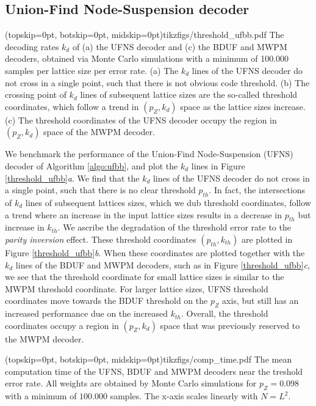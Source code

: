 \subsection{Union-Find Node-Suspension decoder}

\Figure[htb](topskip=0pt, botskip=0pt, midskip=0pt){tikzfigs/threshold_ufbb.pdf}{
  The decoding rates $k_d$ of (a) the UFNS decoder and (c) the BDUF and MWPM decoders, obtained via Monte Carlo simulations with a minimum of 100.000 samples per lattice size per error rate. (a) The $k_d$ lines of the UFNS decoder do not cross in a single point, such that there is not obvious code threshold. (b) The crossing point of $k_d$ lines of subsequent lattice sizes are the so-called threshold coordinates, which follow a trend in $(p_Z, k_d)$ space as the lattice sizes increase. (c) The threshold coordinates of the UFNS decoder occupy the region in $(p_Z, k_d)$ space of the MWPM decoder. \label{threshold_ufbb}}

We benchmark the performance of the Union-Find Node-Suspension (UFNS) decoder of Algorithm \ref{algo:ufbb}, and plot the $k_d$ lines in Figure \ref{threshold_ufbb}\emph{a}. We find that the $k_d$ lines of the UFNS decoder do not cross in a single point, such that there is no clear threshold $p_{th}$. In fact, the intersections of $k_d$ lines of subsequent lattices sizes, which we dub threshold coordinates, follow a trend where an increase in the input lattice sizes results in a decrease in $p_{th}$ but increase in $k_{th}$. We ascribe the degradation of the threshold error rate to the \emph{parity inversion} effect. These threshold coordinates $(p_{th}, k_{th})$ are plotted in Figure \ref{threshold_ufbb}\emph{b}. When these coordinates are plotted together with the $k_d$ lines of the BDUF and MWPM decoders, such as in Figure \ref{threshold_ufbb}\emph{c}, we see that the threshold coordinate for small lattice sizes is similar to the MWPM threshold coordinate. For larger lattice sizes, UFNS threshold coordinates move towards the BDUF threshold on the $p_Z$ axis, but still has an increased performance due on the increased $k_{th}$. Overall, the threshold coordinates occupy a region in $(p_Z, k_d)$ space that was previously reserved to the MWPM decoder. 

\Figure[htb](topskip=0pt, botskip=0pt, midskip=0pt){tikzfigs/comp_time.pdf}{
  The mean computation time of the UFNS, BDUF and MWPM decoders near the treshold error rate. All weights are obtained by Monte Carlo simulations for $p_Z=0.098$ with a minimum of $100.000$ samples. The x-axis scales linearly with $N = L^2$.\label{comp_time}}

